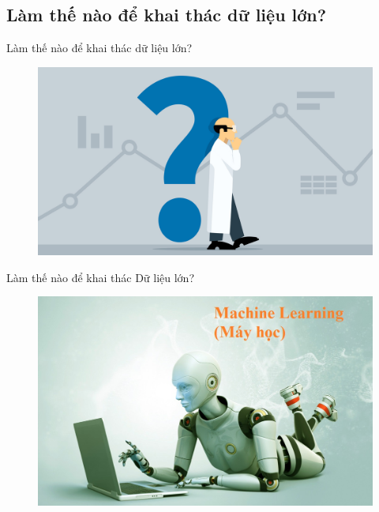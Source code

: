 \documentclass[13spt]{beamer}
\begin{document}
\subsection{Làm thế nào để khai thác dữ liệu lớn?}
\begin{frame}{Làm thế nào để khai thác dữ liệu lớn?}
\transblindshorizontal

	\begin{figure}[h!]
	  \includegraphics[width=1\linewidth,height=0.8\textheight,keepaspectratio]{why.jpg}
	  \label{fig:writing-thesis}
	\end{figure}
\end{frame}


\begin{frame}{Làm thế nào để khai thác Dữ liệu lớn?}
\transboxin

	\begin{figure}[h!]
	  \includegraphics[width=1\linewidth,height=0.8\textheight,keepaspectratio]{machine-learning.jpg}
	  \label{fig:writing-thesis}
	\end{figure}
\end{frame}
\end{document}
